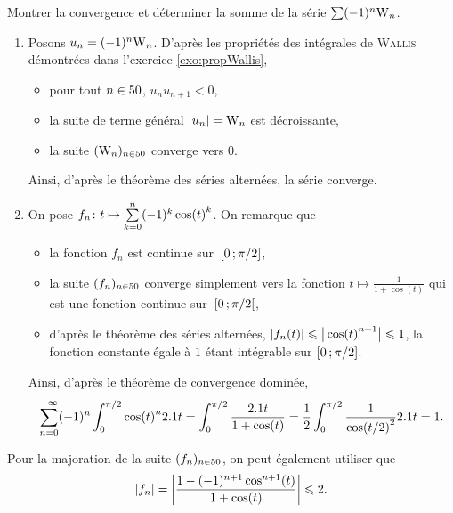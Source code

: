 


\begin{exercice}
Montrer la convergence et déterminer la somme de la série $\sum (-1)^n \Wallis_n$.
\end{exercice}

\begin{solution}
\begin{enumerate}
\item Posons $u_n = (-1)^n \Wallis_n$. D'après les propriétés des intégrales de \textsc{Wallis} démontrées dans l'exercice \ref{exo:propWallis},
\begin{itemize}
\item pour tout $n \in \N$, $u_n u_{n+1} < 0$,
\item la suite de terme général $\abs{u_n} = \Wallis_n$ est décroissante,
\item la suite $(\Wallis_n)_{n \in \N}$ converge vers $0$.
\end{itemize}
Ainsi, d'après le théorème des séries alternées, la série converge.

\item On pose $\fonctionligne[f_n]{t}{\sum\limits_{k=0}^n (-1)^k \cos(t)^k}$. On remarque que
\begin{itemize}
\item la fonction $f_n$ est continue sur~$\interff{0}{\pi/2}$,
\item la suite $(f_n)_{n \in \N}$ converge simplement vers la fonction $t \mapsto \frac{1}{1 + \cos(t)}$ qui est une fonction continue sur~$\interfo{0}{\pi/2}$,
\item d'après le théorème des séries alternées, $\abs{f_n(t)} \leqslant \big|\cos(t)^{n+1}\big| \leqslant 1$, la fonction constante égale à $1$ étant intégrable sur $\interff{0}{\pi/2}$.
\end{itemize}
Ainsi, d'après le théorème de convergence dominée,
\[
\sum_{n=0}^{+\infty} (-1)^n \int_0^{\pi/2} \cos(t)^n \d t
= \int_0^{\pi/2} \frac{\d t}{1 + \cos(t)}
= \frac{1}{2} \int_0^{\pi/2} \frac{1}{\cos(t/2)^2} \d t
= 1.
\]
\end{enumerate}
\end{solution}

\begin{remarque}
Pour la majoration de la suite $(f_n)_{n \in \N}$, on peut également utiliser que
\[
\abs{f_n}
= \module{\frac{1 - (-1)^{n+1} \cos^{n+1}(t)}{1 + \cos(t)}}
\leqslant 2.
\]

\end{remarque}

